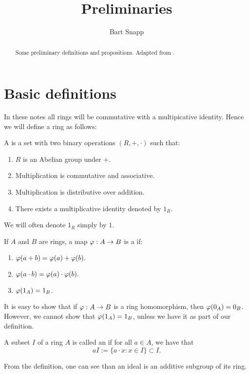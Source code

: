 \documentclass{ximera}
\author{Bart Snapp}
\title{Preliminaries}
\begin{document}
\begin{abstract}
  Some preliminary definitions and propositions. Adapted from \cite{sD2008}.
\end{abstract}
\maketitle

\section{Basic definitions}

In these notes all rings will be commutative with a multipicative
identity. Hence we will define a ring as follows:

\begin{definition} A  is a set with two binary operations $(R, +,\cdot)$ such that:
\begin{enumerate}
\item $R$ is an Abelian group under $+$.
\item Multiplication is commutative and associative. 
\item Multiplication is distributive over addition.
\item There exists a multiplicative identity denoted by $1_R$. 
\end{enumerate}
\end{definition}

We will often denote $1_R$ simply by $1$.

\begin{definition} If $A$ and $B$ are rings, a map $\varphi:A\to B$ is a  if:
\begin{enumerate}
\item $\varphi(a+b) = \varphi(a) + \varphi(b).$
\item $\varphi(a\cdot b) = \varphi(a)\cdot\varphi(b).$
\item $\varphi(1_A) = 1_B$.
\end{enumerate}
\end{definition}
It is easy to show that if $\varphi:A\to B$ is a ring homomorphism, then $\varphi(0_A) = 0_B$. However, we cannot show that $\varphi(1_A) = 1_B$, unless we have it as part of our definition.


\begin{definition} A subset $I$ of a ring $A$ is called an  if for all $a\in A$, we have that
\[
aI := \{a\cdot x: x\in I\} \subset I.
\]
\end{definition}
From the definition, one can see than an ideal is an additive subgroup of its ring.
\end{document}
